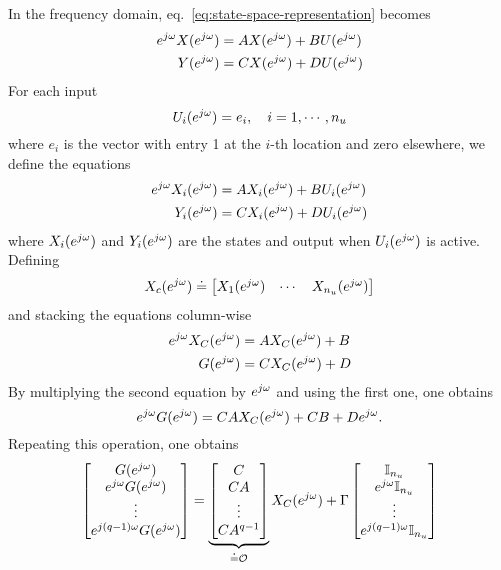 In the frequency domain, eq.~\eqref{eq:state-space-representation} becomes
\begin{equation*}
  \begin{aligned}
    e^{j\omega} X(e^{j\omega}) &= AX(e^{j\omega}) + BU(e^{j\omega}) \\
    Y(e^{j\omega}) &= CX(e^{j\omega}) + DU(e^{j\omega})
  \end{aligned}
\end{equation*}
For each input
\begin{equation*}
  U_i(e^{j\omega}) = e_i, \hspace{1em}i=1,\cdots, n_u
\end{equation*}
where $e_i$ is the vector with entry 1 at the $i$-th location and zero elsewhere, we define the equations
\begin{equation*}
  \begin{aligned}
    e^{j\omega} X_i(e^{j\omega}) &= AX_i(e^{j\omega}) + BU_i(e^{j\omega}) \\
    Y_i(e^{j\omega}) &= CX_i(e^{j\omega}) + DU_i(e^{j\omega})
  \end{aligned}
\end{equation*}
where $X_i(e^{j\omega})$ and $Y_i(e^{j\omega})$ are the states and output when $U_i(e^{j\omega})$ is active. Defining
\begin{equation*}
  X_c(e^{j\omega}) \doteq
  \begin{bmatrix}
    X_1(e^{j\omega}) & \cdots & X_{n_u}(e^{j\omega})
  \end{bmatrix}
\end{equation*}
and stacking the equations column-wise
\begin{equation*}
  \begin{aligned}
    e^{j\omega} X_C(e^{j\omega}) &= AX_C(e^{j\omega}) + B \\
    G(e^{j\omega}) &= CX_C(e^{j\omega}) + D
  \end{aligned}
\end{equation*}
By multiplying the second equation by $e^{j\omega}$ and using the first one, one obtains
\begin{equation*}
  e^{j\omega} G(e^{j\omega}) = CAX_C(e^{j\omega}) + CB + De^{j\omega}.
\end{equation*}
Repeating this operation, one obtains
\begin{equation*}
  \begin{bmatrix}
    G(e^{j\omega}) \\ e^{j\omega} G(e^{j\omega}) \\ \vdots \\ e^{j(q-1)\omega} G(e^{j\omega})
  \end{bmatrix} =
  \underbrace{\begin{bmatrix}
    C \\ CA \\\vdots \\ CA^{q-1}
  \end{bmatrix}}_{\doteq \mathcal{O}} X_C(e^{j\omega}) + \Gamma
\begin{bmatrix}
  \mathbb{I}_{n_u} \\ e^{j\omega} \mathbb{I}_{n_u} \\ \vdots \\ e^{j(q-1)\omega} \mathbb{I}_{n_u}
\end{bmatrix}
\end{equation*}
